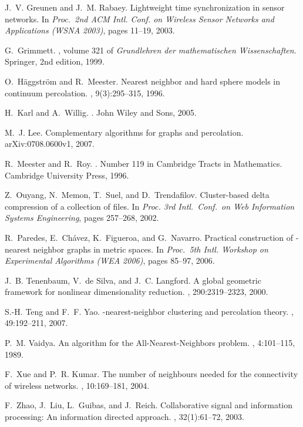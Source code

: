\documentclass[11pt]{article}
\begin{document}
\begin{thebibliography}{10}
J.~V. Greunen and J.~M. Rabaey.
\newblock Lightweight time synchronization in sensor networks.
\newblock In {\em Proc.~2nd ACM Intl. Conf. on Wireless Sensor Networks and
  Applications (WSNA 2003)}, pages 11--19, 2003.

G.~Grimmett.
, volume 321 of {\em Grundlehren der mathematischen
  Wissenschaften}.
\newblock Springer, 2nd edition, 1999.

O.~H\"aggstr\"om and R.~Meester.
\newblock Nearest neighbor and hard sphere models in continuum percolation.
, 9(3):295--315, 1996.

H.~Karl and A.~Willig.
.
\newblock John Wiley and Sons, 2005.

M.~J. Lee.
\newblock Complementary algorithms for graphs and percolation.
\newblock arXiv:0708.0600v1, 2007.

R.~Meester and R.~Roy.
.
\newblock Number 119 in Cambridge Tracts in Mathematics. Cambridge University
  Press, 1996.

Z.~Ouyang, N.~Memon, T.~Suel, and D.~Trendafilov.
\newblock Cluster-based delta compression of a collection of files.
\newblock In {\em Proc. 3rd Intl.\ Conf.\ on Web Information Systems
  Engineering}, pages 257--268, 2002.

R.~Paredes, E.~Ch\'avez, K.~Figueroa, and G.~Navarro.
\newblock Practical construction of -nearest neighbor graphs in metric
  spaces.
\newblock In {\em Proc.~5th Intl. Workshop on Experimental Algorithms (WEA
  2006)}, pages 85--97, 2006.

J.~B. Tenenbaum, V.~{de Silva}, and J.~C. Langford.
\newblock A global geometric framework for nonlinear dimensionality reduction.
, 290:2319--2323, 2000.

S.-H. Teng and F.~F. Yao.
\newblock -nearest-neighbor clustering and percolation theory.
, 49:192--211, 2007.

P.~M. Vaidya.
\newblock An  algorithm for the {All-Nearest-Neighbors} problem.
, 4:101--115, 1989.

F.~Xue and P.~R. Kumar.
\newblock The number of neighbours needed for the connectivity of wireless
  networks.
, 10:169--181, 2004.

F.~Zhao, J.~Liu, L.~Guibas, and J.~Reich.
\newblock Collaborative signal and information processing: An information
  directed approach.
, 32(1):61--72, 2003.

\end{thebibliography}
\end{document}
